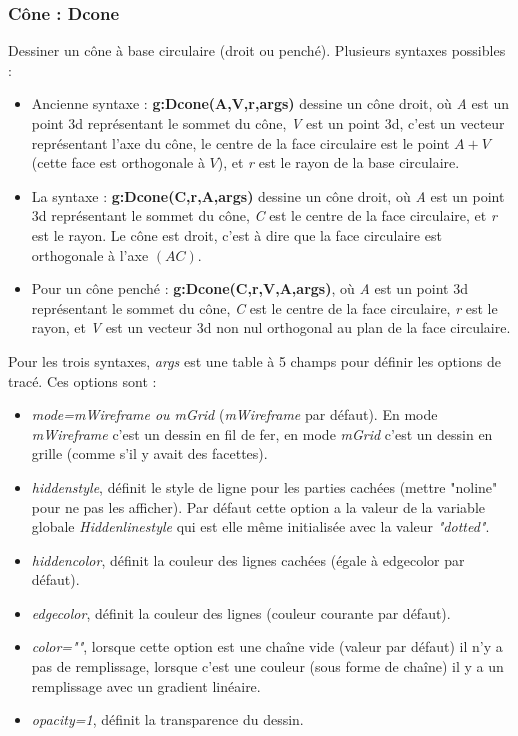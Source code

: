\subsubsection{Cône : Dcone}

Dessiner un cône à base circulaire (droit ou penché). Plusieurs syntaxes possibles :
\begin{itemize}
    \item Ancienne syntaxe : \textbf{g:Dcone(A,V,r,args)} dessine un cône droit, où \emph{A} est un point 3d représentant le sommet du cône, \emph{V} est un point 3d, c'est un vecteur représentant l'axe du cône, le centre de la face circulaire est le point $A+V$ (cette face est orthogonale à $V$), et \emph{r} est le rayon de la base circulaire.
    \item La syntaxe : \textbf{g:Dcone(C,r,A,args)} dessine un cône droit, où \emph{A} est un point 3d représentant le sommet du cône, \emph{C} est le centre de la face circulaire, et \emph{r} est le rayon. Le cône est droit, c'est à dire que la face circulaire est orthogonale à l'axe $(AC)$.
    \item Pour un cône penché :  \textbf{g:Dcone(C,r,V,A,args)}, où \emph{A} est un point 3d représentant le sommet du cône, \emph{C} est le centre de la face circulaire, \emph{r} est le rayon, et \emph{V} est un vecteur 3d non nul orthogonal au plan de la face circulaire.
\end{itemize}
Pour les trois syntaxes, \emph{args} est une table à 5 champs pour définir les options de tracé. Ces options sont :
\begin{itemize}
    \item \emph{mode=mWireframe ou mGrid} (\emph{mWireframe} par défaut). En mode \emph{mWireframe} c'est un dessin en fil de fer, en mode \emph{mGrid} c'est un dessin en grille (comme s'il y avait des facettes).
    \item \emph{hiddenstyle}, définit le style de ligne pour les parties cachées (mettre "noline" pour ne pas les afficher). Par défaut cette option a la valeur de la variable globale \emph{Hiddenlinestyle} qui est elle même initialisée avec la valeur \emph{"dotted"}.
    \item \emph{hiddencolor}, définit la couleur des lignes cachées (égale à edgecolor par défaut).
    \item \emph{edgecolor}, définit la couleur des lignes (couleur courante par défaut).
    \item \emph{color=""}, lorsque cette option est une chaîne vide (valeur par défaut) il n'y a pas de remplissage,  lorsque c'est une couleur (sous forme de chaîne) il y a un remplissage avec un gradient linéaire.
    \item \emph{opacity=1}, définit la transparence du dessin.
\end{itemize}

